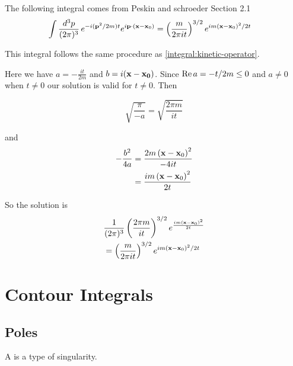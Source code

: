 The following integral comes from Peskin and schroeder Section 2.1
\begin{align}
\int \frac{d^3p}{(2\pi)^3} \, e^{-i(\boldsymbol{\mathbf{p}}^2/2m)t} e^{i\boldsymbol{\mathbf{p}}\cdot(\boldsymbol{\mathbf{x}}-\boldsymbol{\mathbf{x}}_0)}
&= \left( \frac{m}{2\pi i t} \right)^{3/2} e^{im (\boldsymbol{\mathbf{x}}-\boldsymbol{\mathbf{x}}_0)^2 /2t}
\end{align}

This integral follows the same procedure as \ref{integral:kinetic-operator}.

Here we have $a = -\frac{it}{2m}$ and $b = i(\boldsymbol{\mathbf{x}}-\boldsymbol{\mathbf{x_0}})$.
Since $\operatorname{Re}{a} = -t/2m \leq 0$ and $a\neq 0$ when $t\neq 0$ our solution is valid for $t\neq 0$.
Then

$$
\sqrt{ \frac{\pi}{-a} } = \sqrt{ \frac{2\pi m}{it} }
$$

and
\begin{align*}
-\frac{b^2}{4a} &= \frac{2m \left(\boldsymbol{\mathbf{x}}-\boldsymbol{\mathbf{x}}_0\right)^2}{-4it} \\
&= \frac{im \left(\boldsymbol{\mathbf{x}}-\boldsymbol{\mathbf{x}}_0\right)^2}{2t}
\end{align*}

So the solution is
\begin{align*}
& \frac{1}{(2\pi)^3} \left( \frac{2\pi m}{it} \right)^{3/2} e^{\frac{im \left(\boldsymbol{\mathbf{x}}-\boldsymbol{\mathbf{x}}_0\right)^2}{2t}} \\
&= \left( \frac{m}{2\pi it} \right)^{3/2} e^{im \left(\boldsymbol{\mathbf{x}}-\boldsymbol{\mathbf{x}}_0\right)^2 /2t}
\end{align*}







\section{Contour Integrals}

\subsection{Poles}

A  is a type of singularity.

